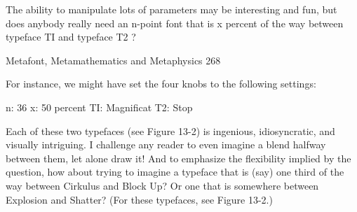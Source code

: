    The ability to manipulate lots of parameters may be interesting and fun, but does
   anybody really need an n-point font that is x percent of the way between typeface
   TI and typeface T2 ?




Metafont, Metamathematics and Metaphysics                                               268

For instance, we might have set the four knobs to the following settings:

                        n: 36
                        x: 50 percent
                        TI: Magnificat
                        T2: Stop

   Each of these two typefaces (see Figure 13-2) is ingenious, idiosyncratic, and visually
intriguing. I challenge any reader to even imagine a blend halfway between them, let
alone draw it! And to emphasize the flexibility implied by the question, how about trying
to imagine a typeface that is (say) one third of the way between Cirkulus and Block Up?
Or one that is somewhere between Explosion and Shatter? (For these typefaces, see
Figure 13-2.)

